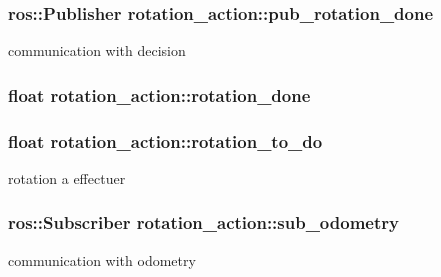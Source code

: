\subsubsection[{\texorpdfstring{pub\+\_\+rotation\+\_\+done}{pub_rotation_done}}]{\setlength{\rightskip}{0pt plus 5cm}ros\+::\+Publisher rotation\+\_\+action\+::pub\+\_\+rotation\+\_\+done\hspace{0.3cm}{\ttfamily [private]}}\hypertarget{classrotation__action_a82d1885ad30462c65d09b87396f81a5f}{}\label{classrotation__action_a82d1885ad30462c65d09b87396f81a5f}
communication with decision 
\subsubsection[{\texorpdfstring{rotation\+\_\+done}{rotation_done}}]{\setlength{\rightskip}{0pt plus 5cm}float rotation\+\_\+action\+::rotation\+\_\+done\hspace{0.3cm}{\ttfamily [private]}}\hypertarget{classrotation__action_a50ba64db1407af812c76311ab05e3512}{}\label{classrotation__action_a50ba64db1407af812c76311ab05e3512}
\subsubsection[{\texorpdfstring{rotation\+\_\+to\+\_\+do}{rotation_to_do}}]{\setlength{\rightskip}{0pt plus 5cm}float rotation\+\_\+action\+::rotation\+\_\+to\+\_\+do\hspace{0.3cm}{\ttfamily [private]}}\hypertarget{classrotation__action_a16ed43ef2421913d1ed7a663a973d70b}{}\label{classrotation__action_a16ed43ef2421913d1ed7a663a973d70b}
rotation a effectuer 
\subsubsection[{\texorpdfstring{sub\+\_\+odometry}{sub_odometry}}]{\setlength{\rightskip}{0pt plus 5cm}ros\+::\+Subscriber rotation\+\_\+action\+::sub\+\_\+odometry\hspace{0.3cm}{\ttfamily [private]}}\hypertarget{classrotation__action_a86ae333af7e86815629ff69e01d95322}{}\label{classrotation__action_a86ae333af7e86815629ff69e01d95322}
communication with odometry 
